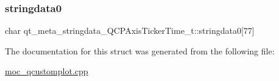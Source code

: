 \subsubsection{\texorpdfstring{stringdata0}{stringdata0}}
{\footnotesize\ttfamily char qt\+\_\+meta\+\_\+stringdata\+\_\+\+Q\+C\+P\+Axis\+Ticker\+Time\+\_\+t\+::stringdata0\mbox{[}77\mbox{]}}



The documentation for this struct was generated from the following file\+:\begin{DoxyCompactItemize}
\item 
\mbox{\hyperlink{moc__qcustomplot_8cpp}{moc\+\_\+qcustomplot.\+cpp}}\end{DoxyCompactItemize}
